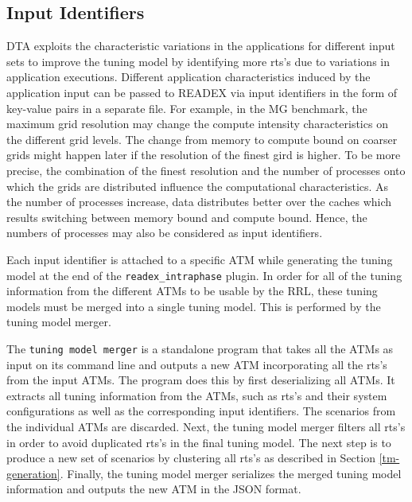 \subsection{Input Identifiers} \label{sec:input}

DTA exploits the characteristic variations in the applications for different input sets to improve the tuning model by identifying more rts's due to variations in application executions. Different application characteristics induced by the application input can be passed to READEX via input identifiers in the form of key-value pairs in a separate file. For example, in the MG benchmark, the maximum grid resolution may change the compute intensity characteristics on the different grid levels. The change from memory to compute bound on coarser grids might happen later if the resolution of the finest gird is higher. To be more precise, the combination of the finest resolution and the number of processes onto which the grids are distributed influence the computational characteristics. As the number of processes increase, data distributes better over the caches which results switching between memory bound and compute bound. Hence, the numbers of processes may also be considered as input identifiers. 

Each input identifier is attached to a specific ATM while generating the tuning model at the end of the \texttt{readex\_intraphase} plugin. In order for all of the tuning information from the different ATMs to be usable by the RRL, these tuning models must be merged into a single tuning model. This is performed by the tuning model merger.

The \texttt{tuning model merger} is a standalone program that takes all the ATMs as input on its command line and outputs a new ATM incorporating all the rts's from the input ATMs. The program does this by first deserializing all ATMs. It extracts all tuning information from the ATMs, such as rts's and their system configurations as well as the corresponding input identifiers. The scenarios from the individual ATMs are discarded. Next, the tuning model merger filters all rts's in order to avoid duplicated rts's in the final tuning model. The next step is to produce a new set of scenarios by clustering all rts's as described in Section \ref{tm-generation}. Finally, the tuning model merger serializes the merged tuning model information and outputs the new ATM in the JSON format.
